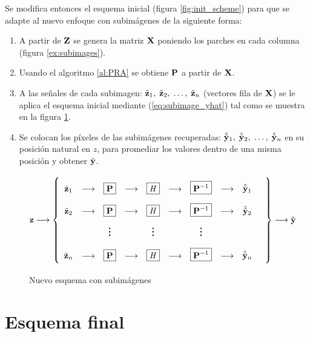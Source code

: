 Se modifica entonces el esquema inicial (figura \ref{fig:init_scheme}) para que se adapte al nuevo enfoque con subim\'agenes de la siguiente forma:
\begin{enumerate}
	\item A partir de $\Z$ se genera la matriz $\X$ poniendo los parches en cada columna (figura \ref{ex:subimages}).
	\item Usando el algoritmo \ref{al:PRA} se obtiene $\P$ a partir de $\X$.
	\item A las señales de cada subimagen: $\ztilde_1,\; \ztilde_2,\; \dots,\; \ztilde_n$ (vectores fila de $\X$) se le aplica el esquema inicial mediante (\ref{eq:subimage_yhat}) tal como se muestra en la figura \ref{fig:subimage_scheme}.
	\item Se colocan los p\'ixeles de las subim\'agenes recuperadas: $\yhattilde_1,\; \yhattilde_2,\; \dots,\; \yhattilde_n$ en su posici\'on natural en $z$, para promediar los valores dentro de una misma posici\'on y obtener $\yhat$.
\end{enumerate}

\begin{figure}[H]
	\begin{equation*}
		\z\longrightarrow\left\{
		\def\arraystretch{2.2}
		\begin{array}{ccccccccccc}
			\ztilde_1 & \longrightarrow & \boxed{\P} & \longrightarrow & \boxed{\H} & \longrightarrow & \boxed{\P^{-1}} & \longrightarrow & \yhattilde_1\\
			\ztilde_2 & \longrightarrow & \boxed{\P} & \longrightarrow & \boxed{\H} & \longrightarrow & \boxed{\P^{-1}} & \longrightarrow & \yhattilde_2\\
			& & \huge\vdots &  & \huge\vdots &  & \huge\vdots & & & \\
			\ztilde_n & \longrightarrow & \boxed{\P} & \longrightarrow & \boxed{\H} & \longrightarrow & \boxed{\P^{-1}} & \longrightarrow & \yhattilde_n\\
		\end{array}
		\right\}\longrightarrow\yhat
	\end{equation*}
	\caption{Nuevo esquema con subim\'agenes}
	\label{fig:subimage_scheme}
\end{figure}

\section{Esquema final}\label{sec:final_scheme}


